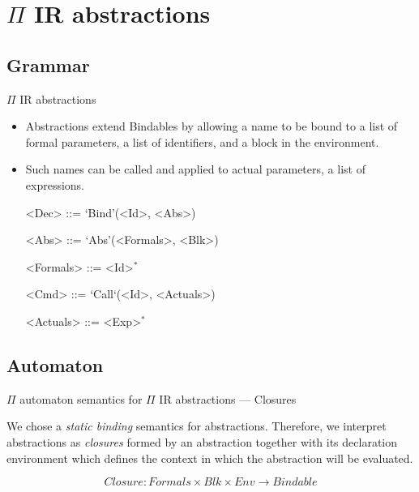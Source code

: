 \documentclass{beamer}
\begin{document}
\section{$\Pi$ IR abstractions}

\subsection{Grammar}


\begin{frame}{{\color{red}$\Pi$ IR} abstractions}

\begin{itemize}
\item Abstractions extend Bindables by allowing a name to be bound to a list of formal parameters, a list of identifiers, and a block in the environment.
\item Such names can be called and applied to actual parameters, a list of expressions.
\begin{grammar}
<Dec>       ::= `Bind'(<Id>, <Abs>) 

<Abs>       ::= `Abs'(<Formals>, <Blk>) 

<Formals> ::= <Id>$^*$

<Cmd> ::= `Call`(<Id>, <Actuals>)

<Actuals> ::= <Exp>$^*$
\end{grammar}
\end{itemize}

\end{frame}

\subsection{Automaton}

\begin{frame}{{\color{red}$\Pi$ automaton} semantics for {\color{red}$\Pi$ IR} abstractions --- Closures}

We chose a \emph{static binding} semantics for abstractions. Therefore, we interpret abstractions as \emph{closures} formed by an abstraction together with its declaration environment which defines the context in which the abstraction will be evaluated.

\[
\mathit{Closure} : \mathit{Formals} \times \mathit{Blk} \times \mathit{Env} \to \mathit{Bindable}
\]

\end{frame}
\end{document}
